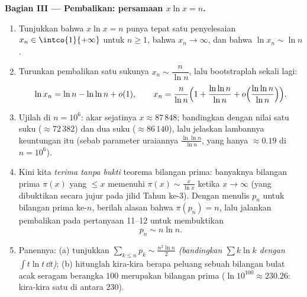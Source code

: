 \begin{problem}
\medskip
\noindent\textbf{Bagian III --- Pembalikan: persamaan $x\ln x =
n$.}
\begin{enumerate}[resume]
  \item Tunjukkan bahwa $x\ln x = n$ punya tepat satu penyelesaian $x_n
        \in \intco{1}{+\infty}$ untuk $n \geq 1$, bahwa $x_n \to
        \infty$, dan bahwa $\ln x_n \sim \ln n$.
  \item Turunkan pembalikan satu sukunya $x_n \sim
        \dfrac{n}{\ln n}$, lalu bootstraplah sekali lagi:
        \[
        \ln x_n = \ln n - \ln\ln n + o(1),
        \qquad
        x_n = \frac{n}{\ln n}\Bigl(1 + \frac{\ln\ln n}{\ln n}
        + o\Bigl(\frac{\ln\ln n}{\ln n}\Bigr)\Bigr).
        \]
  \item Ujilah di $n = 10^6$: akar sejatinya $x \approx
        87\,848$; bandingkan dengan nilai satu suku ($\approx 72\,382$)
        dan dua suku ($\approx 86\,140$), lalu jelaskan
        lambannya keuntungan itu (sebab parameter uraiannya
        $\frac{\ln\ln n}{\ln n}$, yang hanya $\approx 0.19$ di $n = 10^6$).
  \item Kini kita \emph{terima tanpa bukti} teorema bilangan prima:
        banyaknya bilangan prima $\pi(x)$ yang $\leq x$ memenuhi $\pi(x)
        \sim \frac{x}{\ln x}$ ketika $x \to \infty$ (yang dibuktikan
        secara jujur pada jilid Tahun ke-3). Dengan menulis $p_n$ untuk
        bilangan prima ke-$n$, berilah alasan bahwa $\pi(p_n) = n$, lalu
        jalankan pembalikan pada pertanyaan 11--12 untuk membuktikan
        \[
        p_n \sim n \ln n .
        \]
  \item Panennya: (a) tunjukkan $\sum_{k \leq n} p_k \sim
        \frac{n^2\ln n}{2}$ \emph{(bandingkan $\sum k\ln k$ dengan
        $\int t\ln t\,\dd t$)}; (b) hitunglah kira-kira berapa
        peluang sebuah bilangan bulat acak seragam berangka $100$
        merupakan bilangan prima ($\ln 10^{100} \approx 230.26$: kira-kira
        satu di antara $230$).
\end{enumerate}


\end{problem}
